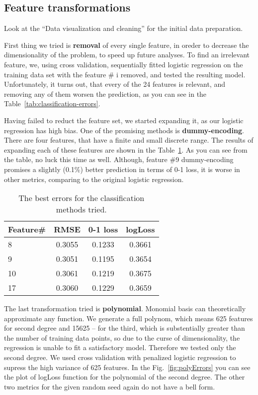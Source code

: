 \documentclass{article} %
\begin{document}
\subsection{Feature transformations}
Look at the ``Data visualization and cleaning'' for the initial data preparation.

First thing we tried is {\bf removal} of every single feature, in oreder to decrease the dimensionality of the problem, to speed up future analyses. To find an irrelevant feature, we, using cross validation, sequentially fitted logistic regression on the training data set with the feature \# i removed, and tested the resulting model. Unfortunately, it turns out, that every of the 24 features is relevant, and removing any of them worsen the prediction, as you can see in the Table~\ref{tab:classification-errors}.

Having failed to reduct the feature set, we started expanding it, as our logistic regression has high bias. One of the promising methods is {\bf dummy-encoding}. There are four features, that have a finite and small discrete range. The results of expanding each of these features are shown in the Table~\ref{tab:classification-dummy}. As you can see from the table, no luck this time as well. Although, feature \#9 dummy-encoding promises a slightly (0.1\%) better prediction in terms of 0-1 loss, it is worse in other metrics, comparing to the original logistic regression.
\begin{table}[h]
  \begin{center}
    \begin{tabular}{l|ccc}
      Feature\# & RMSE & 0-1 loss & logLoss \\
      \hline
      8 & 0.3055 & 0.1233 & 0.3661 \\
      9 & 0.3051 & 0.1195 & 0.3654 \\
      10 & 0.3061 & 0.1219 & 0.3675 \\
      17 & 0.3060 & 0.1229 & 0.3659
    \end{tabular}
    \caption{The best errors for the classification methods tried.}
    \label{tab:classification-dummy}
  \end{center}
\end{table}

The last transformation tried is {\bf polynomial}. Monomial basis can theoretically approximate any function. We generate a full polynom, which means 625 features for second degree and 15625 -- for the third, which is substentially greater than the number of training data points, so due to the curse of dimensionality, the regression is unable to fit a satisfactory model. Therefore we tested only the second degree. We used cross validation with penalized logistic regression to supress the high variance of 625 features. In the Fig.~\ref{fig:polyErrors} you can see the plot of logLoss function for the polynomial of the second degree. The other two metrics for the given random seed again do not have a bell form.
\end{document}
